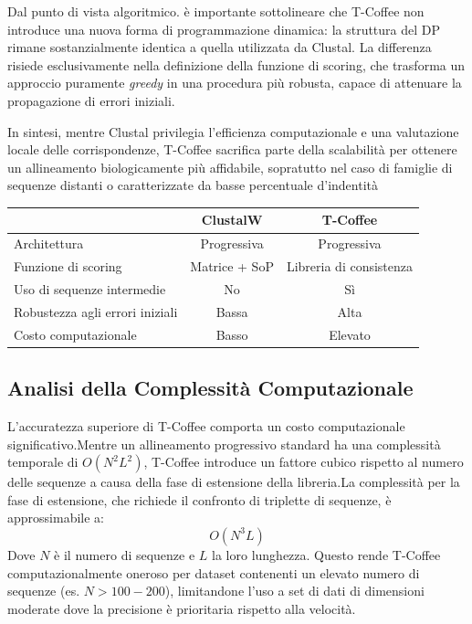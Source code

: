 Dal punto di vista algoritmico. è importante sottolineare che T-Coffee non 
introduce una nuova forma di programmazione dinamica: la struttura del DP 
rimane sostanzialmente identica a quella utilizzata da Clustal. La differenza
risiede esclusivamente nella definizione della funzione di scoring, che 
trasforma un approccio puramente \emph{greedy} in una procedura più robusta,
capace di attenuare la propagazione di errori iniziali.

In sintesi, mentre Clustal privilegia l'efficienza computazionale e 
una valutazione locale delle corrispondenze, T-Coffee sacrifica parte 
della scalabilità per ottenere un allineamento biologicamente più affidabile,
sopratutto nel caso di famiglie di sequenze distanti o caratterizzate da 
basse percentuale d'indentità

\begin{center}
\begin{tabular}{lcc}
\hline
 & ClustalW & T-Coffee \\
\hline
Architettura & Progressiva & Progressiva \\
Funzione di scoring & Matrice + SoP & Libreria di consistenza \\
Uso di sequenze intermedie & No & Sì \\
Robustezza agli errori iniziali & Bassa & Alta \\
Costo computazionale & Basso & Elevato \\
\hline
\end{tabular}
\end{center}

\subsection{Analisi della Complessità Computazionale}
L'accuratezza superiore di T-Coffee comporta un costo computazionale significativo.Mentre un allineamento progressivo standard ha una complessità temporale di $O(N^2L^2)$, T-Coffee introduce un fattore cubico rispetto al numero delle sequenze a causa della fase di estensione della libreria.La complessità per la fase di estensione, che richiede il confronto di triplette di sequenze, è approssimabile a:$$O(N^3 L)$$Dove $N$ è il numero di sequenze e $L$ la loro lunghezza. Questo rende T-Coffee computazionalmente oneroso per dataset contenenti un elevato numero di sequenze (es. $N > 100-200$), limitandone l'uso a set di dati di dimensioni moderate dove la precisione è prioritaria rispetto alla velocità.

